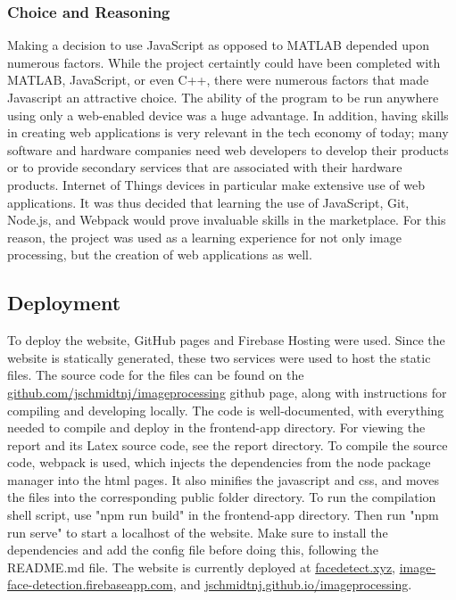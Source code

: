 \documentclass{article}
\let\Oldsubsection\subsection
\renewcommand{\subsection}{\FloatBarrier\Oldsubsection}
\let\Oldsubsubsection\subsubsection
\renewcommand{\subsubsection}{\FloatBarrier\Oldsubsubsection}
\begin{document}
  \subsubsection{Choice and Reasoning}

  Making a decision to use JavaScript as opposed to MATLAB depended upon numerous factors. While the project certaintly could have been completed with MATLAB, JavaScript, or even C++, there were numerous factors that made Javascript an attractive choice. The ability of the program to be run anywhere using only a web-enabled device was a huge advantage. In addition, having skills in creating web applications is very relevant in the tech economy of today; many software and hardware companies need web developers to develop their products or to provide secondary services that are associated with their hardware products. Internet of Things devices in particular make extensive use of web applications. It was thus decided that learning the use of JavaScript, Git, Node.js, and Webpack would prove invaluable skills in the marketplace. For this reason, the project was used as a learning experience for not only image processing, but the creation of web applications as well.

  \subsection{Deployment}

  To deploy the website, GitHub pages and Firebase Hosting were used. Since the website is statically generated, these two services were used to host the static files. The source code for the files can be found on the \href{https://github.com/jschmidtnj/imageprocessing}{github.com/jschmidtnj/imageprocessing} github page, along with instructions for compiling and developing locally. The code is well-documented, with everything needed to compile and deploy in the frontend-app directory. For viewing the report and its Latex source code, see the report directory. To compile the source code, webpack is used, which injects the dependencies from the node package manager into the html pages. It also minifies the javascript and css, and moves the files into the corresponding public folder directory. To run the compilation shell script, use "npm run build" in the frontend-app directory. Then run "npm run serve" to start a localhost of the website. Make sure to install the dependencies and add the config file before doing this, following the README.md file. The website is currently deployed at \href{https://facedetect.xyz/}{facedetect.xyz}, \href{https://image-face-detection.firebaseapp.com/}{image-face-detection.firebaseapp.com}, and \href{https://jschmidtnj.github.io/ImageProcessing/}{jschmidtnj.github.io/imageprocessing}.
\end{document}
